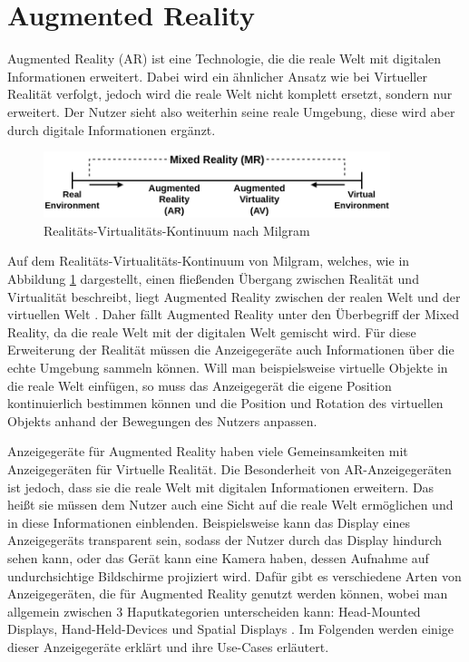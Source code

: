   \section{Augmented Reality}
  Augmented Reality (AR) ist eine Technologie, die die reale Welt mit digitalen Informationen erweitert.
  Dabei wird ein ähnlicher Ansatz wie bei Virtueller Realität verfolgt, jedoch wird die reale Welt nicht komplett ersetzt, sondern nur erweitert.
  Der Nutzer sieht also weiterhin seine reale Umgebung, diese wird aber durch digitale Informationen ergänzt.
  \begin{figure}[H]
    \centering
    \includegraphics[width=0.9\textwidth]{images/RV-Continuum.png}
    \caption{Realitäts-Virtualitäts-Kontinuum nach Milgram}
    \label{fig:rv-continuum}
  \end{figure}
  Auf dem Realitäts-Virtualitäts-Kontinuum von Milgram, welches, wie in Abbildung \ref{fig:rv-continuum} dargestellt, einen fließenden Übergang zwischen Realität und Virtualität beschreibt, liegt Augmented Reality zwischen der realen Welt und der virtuellen Welt \autocite[vgl.][S.9]{milgram1999}.
  Daher fällt Augmented Reality unter den Überbegriff der Mixed Reality, da die reale Welt mit der digitalen Welt gemischt wird.
  Für diese Erweiterung der Realität müssen die Anzeigegeräte auch Informationen über die echte Umgebung sammeln können.
  Will man beispielsweise virtuelle Objekte in die reale Welt einfügen, so muss das Anzeigegerät die eigene Position kontinuierlich bestimmen können und die Position und Rotation des virtuellen Objekts anhand der Bewegungen des Nutzers anpassen.

  Anzeigegeräte für Augmented Reality haben viele Gemeinsamkeiten mit Anzeigegeräten für Virtuelle Realität.
  Die Besonderheit von AR-Anzeigegeräten ist jedoch, dass sie die reale Welt mit digitalen Informationen erweitern.
  Das heißt sie müssen dem Nutzer auch eine Sicht auf die reale Welt ermöglichen und in diese Informationen einblenden.
  Beispielsweise kann das Display eines Anzeigegeräts transparent sein, sodass der Nutzer durch das Display hindurch sehen kann, oder das Gerät kann eine Kamera haben, dessen Aufnahme auf undurchsichtige Bildschirme projiziert wird.
  Dafür gibt es verschiedene Arten von Anzeigegeräten, die für Augmented Reality genutzt werden können, wobei man allgemein zwischen 3 Haputkategorien unterscheiden kann: Head-Mounted Displays, Hand-Held-Devices und Spatial Displays \autocite[][S. 346]{Carmigniani2011}.
  Im Folgenden werden einige dieser Anzeigegeräte erklärt und ihre Use-Cases erläutert.

